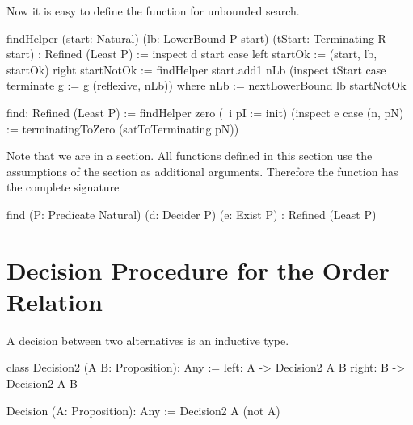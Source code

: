 Now it is easy to define the function for unbounded search.

\begin{alba}
    findHelper
        (start: Natural)
        (lb: LowerBound P start)
        (tStart: Terminating R start)
        : Refined (Least P)
    :=
        inspect d start case
            left startOk :=
                (start, lb, startOk)
            right startNotOk :=
                findHelper
                    start.add1
                    nLb
                    (inspect tStart case
                        terminate g :=
                            g (reflexive, nLb))
                where
                    nLb := nextLowerBound lb startNotOk

    find: Refined (Least P) :=
        findHelper
            zero
            (\ i pI := init)
            (inspect e case
                (n, pN) :=
                    terminatingToZero (satToTerminating pN))
\end{alba}

Note that we are in a section. All functions defined in this section use the
assumptions of the section as additional arguments. Therefore the function
 has the complete signature
%
\begin{alba}
    find
        (P: Predicate Natural) (d: Decider P) (e: Exist P)
        : Refined (Least P)
\end{alba}







\vskip 5mm
\section{Decision Procedure for the Order Relation}



A decision between two alternatives is an inductive type.

\begin{alba}
    class Decision2 (A B: Proposition): Any :=
        left: A  -> Decision2 A B
        right: B -> Decision2 A B

    Decision (A: Proposition): Any :=
        Decision2 A (not A)
\end{alba}



